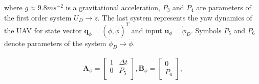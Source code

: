 where $g \approx 9.8 ms^{-2}$ is a gravitational acceleration, $P_3$ and $P_4$ are parameters of the first order system $U_D \rightarrow \ddot{z}$. The last system represents the yaw dynamics of the UAV for state vector $\mathbf{q}_{\phi} = \left(\phi, \dot{\phi}\right)^T$ and input $\mathbf{u}_\phi = \dot{\phi}_D$. Symbols $P_5$ and $P_6$ denote parameters of the system $\dot{\phi}_D \rightarrow \dot{\phi}$.

\begin{equation}
\begin{split}
\mathbf{A}_{\phi} = \begin{bmatrix}
1 & \Delta t\\
0 & P_5 \\
\end{bmatrix}, \mathbf{B}_{\phi} = \begin{bmatrix}
0\\
P_6
\end{bmatrix},
\end{split}
\end{equation}